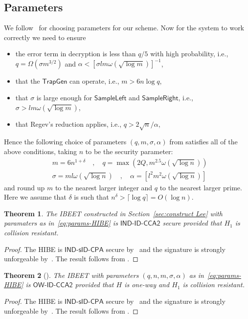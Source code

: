 \documentclass[runningheads]{llncs}
\newtheorem{thm}{Theorem}%
\def\TrapGen{\mathsf{TrapGen}}
\def\SampleLeft{\mathsf{SampleLeft}}
\def\SampleRight{\mathsf{SampleRight}}
\begin{document}
\subsection{Parameters}
We follow~{\cite[Section 8.3]{ABB10-EuroCrypt}} for choosing parameters for our scheme. Now for the system to work correctly we need to ensure
\begin{itemize}
	\item the error term in decryption is less than ${q}/{5}$ with high probability, i.e., $q=\Omega(\sigma m^{3/2})$ and $\alpha<[\sigma lm\omega(\sqrt{\log m})]^{-1}$,
	\item that the $\TrapGen$ can operate, i.e., $m>6n\log q$,
	\item that $\sigma$ is large enough for $\SampleLeft$ and $\SampleRight$, i.e.,
	$\sigma>lm\omega(\sqrt{\log m})$,
	\item that Regev's reduction applies, i.e., $q>2\sqrt{n}/\alpha$,
\end{itemize}
Hence the following choice of parameters $(q,m,\sigma,\alpha)$ from \cite{ABB10-EuroCrypt} satisfies all of the above conditions, taking $n$ to be the security parameter:
\begin{equation}\label{eq:params-HIBE}
\begin{aligned}
& m=6n^{1+\delta}\quad,\quad q=\max(2Q,m^{2.5}\omega(\sqrt{\log n})) \\
& \sigma = ml\omega(\sqrt{\log n})\quad,\quad\alpha=[l^2m^2\omega(\sqrt{\log n})]
\end{aligned}
\end{equation}
and round up $m$ to the nearest larger integer and $q$ to the nearest larger prime. Here we assume that $\delta$ is such that $n^\delta>\lceil\log q\rceil=O(\log n)$.




\begin{thm}
	The IBEET constructed in Section~\ref{sec:construct Lee} with paramaters as in~\eqref{eq:params-HIBE} is $\textsf{IND-ID-CCA2}$ secure provided that $H_1$ is collision resistant. 
\end{thm}

\begin{proof}
	The HIBE is $\textsf{IND-sID-CPA}$ secure by~{\cite[Theorem 33]{ABB10-EuroCrypt}} and the signature is strongly unforgeable by~{\cite[Section 7.5]{ABB10-EuroCrypt}}. The result follows from {\cite[Theorem 5]{Lee2016}}.
\end{proof}



\begin{thm}[{\cite[Theorem 3]{Lee2016}}]
	The IBEET with parameters $(q,n,m,\sigma,\alpha)$ as in~\eqref{eq:params-HIBE} is $\textsf{OW-ID-CCA2}$ provided that $H$ is one-way and  $H_1$ is collision resistant.
\end{thm}

\begin{proof}
	The HIBE is $\textsf{IND-sID-CPA}$ secure by~{\cite[Theorem 33]{ABB10-EuroCrypt}} and the signature is strongly unforgeable by~{\cite[Section 7.5]{ABB10-EuroCrypt}}. The result follows from {\cite[Theorem 6]{Lee2016}}.
\end{proof}
\end{document}

